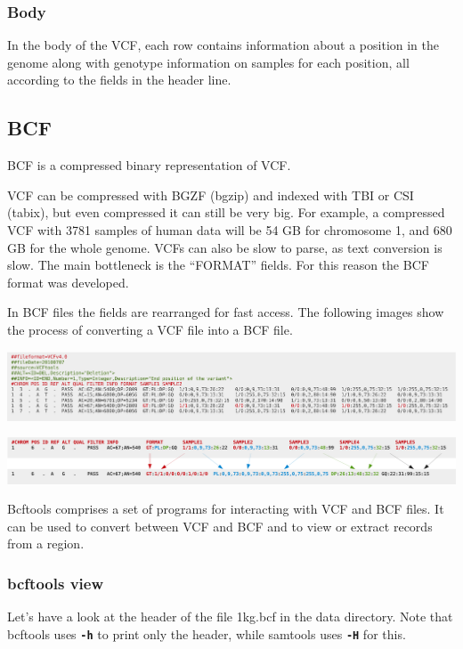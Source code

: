 \documentclass[11pt]{article}
\begin{document}
\hypertarget{body}{%
\subsubsection{Body}\label{body}}

In the body of the VCF, each row contains information about a position
in the genome along with genotype information on samples for each
position, all according to the fields in the header line.

\hypertarget{bcf}{%
\subsection{BCF}\label{bcf}}

BCF is a compressed binary representation of VCF.

VCF can be compressed with BGZF (bgzip) and indexed with TBI or CSI
(tabix), but even compressed it can still be very big. For example, a
compressed VCF with 3781 samples of human data will be 54 GB for
chromosome 1, and 680 GB for the whole genome. VCFs can also be slow to
parse, as text conversion is slow. The main bottleneck is the ``FORMAT''
fields. For this reason the BCF format was developed.

In BCF files the fields are rearranged for fast access. The following
images show the process of converting a VCF file into a BCF file.

    \includegraphics{img/VCF2.png}

    \includegraphics{img/VCF3.png}

    Bcftools comprises a set of programs for interacting with VCF and BCF
files. It can be used to convert between VCF and BCF and to view or
extract records from a region.

\hypertarget{bcftools-view}{%
\subsubsection{bcftools view}\label{bcftools-view}}

Let's have a look at the header of the file 1kg.bcf in the data
directory. Note that bcftools uses \textbf{\texttt{-h}} to print only
the header, while samtools uses \textbf{\texttt{-H}} for this.
\end{document}
